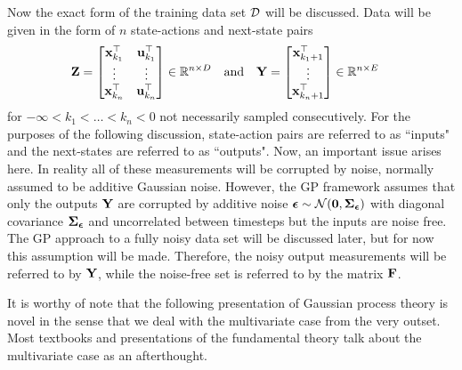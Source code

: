 
Now the exact form of the training data set $\mathcal{D}$ will be discussed. Data will be given in the form of $n$ state-actions and next-state pairs
\begin{align}
\mathbf{Z} &= \begin{bmatrix}  \mathbf{x}_{k_1}^\top & \mathbf{u}_{k_1}^\top \\ \vdots & \vdots \\ \mathbf{x}_{k_n}^\top & \mathbf{u}_{k_n}^\top \end{bmatrix} \in \mathbb{R}^{n \times D} &\text{and}
&& \mathbf{Y} &= \begin{bmatrix}  \mathbf{x}_{k_1+1}^\top \\ \vdots \\ \mathbf{x}_{k_n+1}^\top  \end{bmatrix} \in \mathbb{R}^{n\times E} \label{eqn:cZY}
\end{align}
for $-\infty < k_1 < \dots < k_n < 0$ not necessarily sampled consecutively. For the purposes of the following discussion, state-action pairs are referred to as ``inputs" and the next-states are referred to as ``outputs". Now, an important issue arises here. In reality all of these measurements will be corrupted by noise, normally assumed to be additive Gaussian noise. However, the GP framework assumes that only the outputs $\mathbf{Y}$ are corrupted by additive noise $\boldsymbol{\epsilon} \sim \mathcal{N}(\mathbf{0}, \boldsymbol{\Sigma}_{\boldsymbol{\epsilon}})$ with diagonal covariance $\boldsymbol{\Sigma}_{\boldsymbol{\epsilon}}$ and uncorrelated between timesteps but the inputs are noise free. The GP approach to a fully noisy data set will be discussed later, but for now this assumption will be made. Therefore, the noisy output measurements will be referred to by $\mathbf{Y}$, while the noise-free set is referred to by the matrix $\mathbf{F}$.

It is worthy of note that the following presentation of Gaussian process theory is novel in the sense that we deal with the multivariate case from the very outset. Most textbooks and presentations of the fundamental theory talk about the multivariate case as an afterthought.







